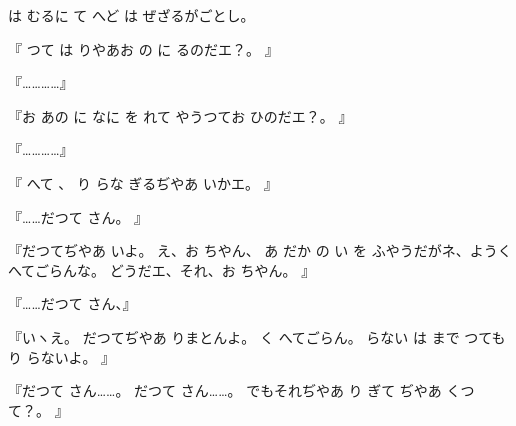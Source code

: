 は
むるに
て
へど
は
ぜざるがごとし。

『
つて
は
りやあお
の
に
るのだエ？。
』

『…………』

『お
あの
に
なに
を
れて
やうつてお
ひのだエ？。
』

『…………』

『
へて
、
り
らな
ぎるぢやあ
いかエ。
』

『……だつて
さん。
』

『だつてぢやあ
いよ。
え、お
ちやん、
あ
だか
の
い
を
ふやうだがネ、ようく
へてごらんな。
どうだエ、それ、お
ちやん。
』

『……だつて
さん、』

『いヽえ。
だつてぢやあ
りまとんよ。
く
へてごらん。
らない
は
まで
つても
り
らないよ。
』

『だつて
さん……。
だつて
さん……。
でもそれぢやあ
り
ぎて
ぢやあ
くつて？。
』

